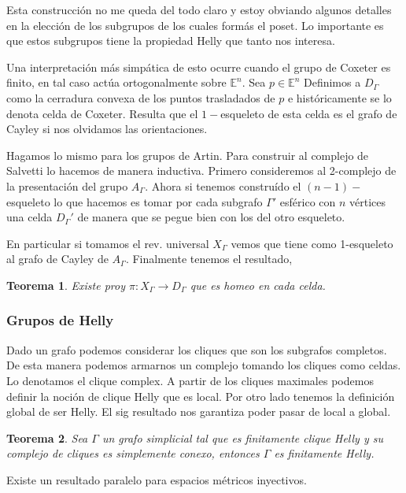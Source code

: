 \documentclass[13pt]{scrartcl}
\theoremstyle{plain} %
\newtheorem{teo}{\color{rojo} Teorema}
\theoremstyle{definition}
\theoremstyle{remark}
\newcommand{\blue}{\textcolor{chulo}}
\begin{document}
	Esta construcción no me queda del todo claro y estoy obviando algunos detalles en la elección de los subgrupos de los cuales formás el poset. Lo importante es que estos subgrupos tiene la propiedad Helly que tanto nos interesa.
	
	Una interpretación más simpática de esto ocurre cuando el grupo de Coxeter es finito, en tal caso actúa ortogonalmente sobre $\mathbb E^n$. Sea $p \in \mathbb E^n$ Definimos a $D_\Gamma$ como la cerradura convexa de los puntos trasladados de $p$ e históricamente se lo denota \blue{celda de Coxeter}. Resulta que el $1-$esqueleto de esta celda es el grafo de Cayley si nos olvidamos las orientaciones.
	
	Hagamos lo mismo para los grupos de Artin. Para construir al \blue{complejo de Salvetti} lo hacemos de manera inductiva. Primero consideremos al 2-complejo de la presentación del grupo $A_\Gamma$. Ahora si tenemos construído el $(n-1)-$esqueleto lo que hacemos es tomar por cada subgrafo $\Gamma'$ esférico con $n$ vértices una celda $D_\Gamma'$ de manera que se pegue bien con los del otro esqueleto.
	
	En particular si tomamos el rev. universal $X_\Gamma$ vemos que tiene como 1-esqueleto al grafo de Cayley de $A_\Gamma$. Finalmente tenemos el resultado,
	\begin{teo}
		Existe proy $\pi: X_\Gamma \to D_\Gamma$ que es homeo en cada celda.
 	\end{teo}
	
	
	\subsubsection{Grupos de Helly}
	
	Dado un grafo podemos considerar los cliques que son los subgrafos completos. De esta manera podemos armarnos un complejo tomando los cliques como celdas. Lo denotamos el \blue{clique complex}. A partir de los cliques maximales podemos definir la noción de \blue{clique Helly} que es local. Por otro lado tenemos la definición global de ser Helly. El sig resultado nos garantiza poder pasar de local a global.
	
	\begin{teo}
		Sea $\Gamma$ un grafo simplicial tal que es finitamente clique Helly y su complejo de cliques es simplemente conexo, entonces $\Gamma$ es finitamente Helly.
	\end{teo}
	
	Existe un resultado paralelo para espacios métricos inyectivos.
	
\end{document}
